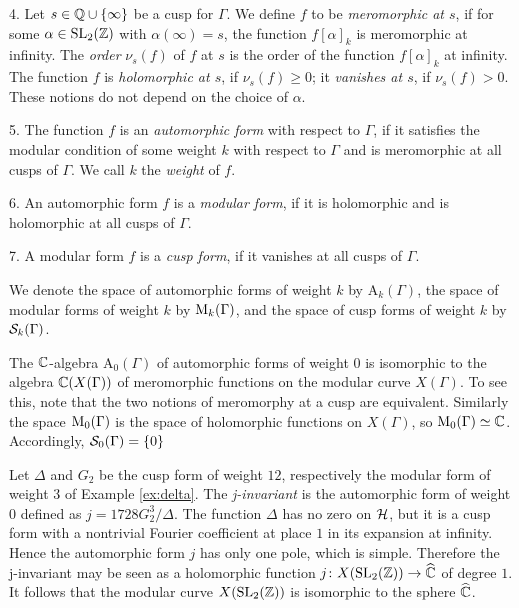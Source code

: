 \begin{defi}
  4. Let $s\in\mathbb{Q}\cup\{\infty\}$ be a cusp for $\Gamma$. We define $f$ to be \emph{meromorphic at $s$}, if for some $\alpha\in\operatorname{SL}_2(\mathbb{Z})$ with $\alpha (\infty)=s$, the function $f[\alpha]_k$ is meromorphic at infinity. The \emph{order} $\nu_s(f)$ of $f$ at $s$ is the order of the function $f[\alpha]_k$ at infinity. The function $f$ is \emph{holomorphic at $s$}, if $\nu_s(f)\geq 0$; it \emph{vanishes at $s$}, if $\nu_s(f)>0$. These notions do not depend on the choice of $\alpha$. 
  
  5. The function $f$ is an \emph{automorphic form} with respect to $\Gamma$, if it satisfies the modular condition of some weight $k$ with respect to $\Gamma$ and is meromorphic at all cusps of $\Gamma$. We call $k$ the \emph{weight} of $f$.
  
  6. An automorphic form $f$ is a \emph{modular form}, if it is holomorphic and is holomorphic at all cusps of $\Gamma$.
  
  7. A modular form $f$ is a \emph{cusp form}, if it vanishes at all cusps of $\Gamma$. 
\end{defi}

We denote the space of automorphic forms of weight $k$ by $\mathrm{A}_k(\Gamma)$, the space of modular forms of weight $k$ by $\mathrm{M}_k(\Gamma)$, and the space of cusp forms of weight $k$ by $\mathcal{S}_k(\Gamma)$.

\begin{rmk}
 The $\mathbb{C}$-algebra $\mathrm{A}_0(\Gamma)$ of automorphic forms of weight $0$ is isomorphic to the algebra $\mathbb{C}(X(\Gamma))$ of meromorphic functions on the modular curve $X(\Gamma)$. To see this, note that the two notions of meromorphy at a cusp are equivalent. Similarly the space $\mathrm{M}_0(\Gamma)$ is the space of holomorphic functions on $X(\Gamma)$, so $\mathrm{M}_0(\Gamma)\simeq\mathbb{C}$. Accordingly, $\mathcal{S}_0(\Gamma)=\{0\}$
\end{rmk}

\begin{expl} \label{ex:j-invariant}
 Let $\Delta$ and $G_2$ be the cusp form of weight $12$, respectively the modular form of weight $3$ of Example \ref{ex:delta}. The \emph{j-invariant} is the automorphic form of weight $0$ defined as $j=1728 G_2^3 / \Delta$. The function $\Delta$ has no zero on $\mathcal{H}$, but it is a cusp form with a nontrivial Fourier coefficient at place $1$ in its expansion at infinity. Hence the automorphic form $j$ has only one pole, which is simple. Therefore the j-invariant may be seen as a holomorphic function $j\colon X(\operatorname{SL}_2(\mathbb{Z})) \to\widehat{\mathbb{C}}$ of degree $1$. It follows that the modular curve $X(\operatorname{SL}_2(\mathbb{Z}))$ is isomorphic to the sphere $\widehat{\mathbb{C}}$.
\end{expl}

